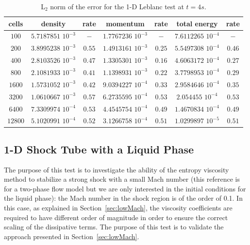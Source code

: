 \documentclass[review,10pt]{elsarticle}
\newcommand{\sct}[1]{Section~\ref{#1}}                   %
\begin{document}
\begin{table}[!htbp]
\begin{center}
 \caption{\label{tbl:l2_norm_leblanc} L$_2$ norm of the error for the 1-D Leblanc test at $t=4s$.}
 \begin{tabular}{|c|c|c|c|c|c|c|}
 \hline
   cells & density & rate & momentum & rate & total energy & rate \\ \hline
$100$ &   $5.7187851$ $10^{-3}$ & $-$ & $1.7767236$ $10^{-3}$ & $-$ & $7.6112265$  $10^{-4}$& $-$\\   \hline
$200$  &  $3.8995238$ $10^{-3}$ & $0.55$ & $1.4913161$ $10^{-3}$ & $0.25$ &  $5.5497308$ $10^{-4}$& $0.46$\\ \hline
$400$ & $2.8103526$ $10^{-3}$   & $0.47$ & $1.3305301$ $10^{-3}$ & $0.16$ & $4.6063172$ $10^{-4}$ & $0.27$\\ \hline
$800$ & $2.1081933$ $10^{-3}$   & $0.41$ & $1.1398931$ $10^{-3}$ & $0.22$ & $3.7798953$ $10^{-4}$ & $0.29$\\ \hline
$1600$ & $1.5731052$ $10^{-3}$  & $0.42$ & $9.0394227$ $10^{-4}$ & $0.33$ & $2.9584646$ $10^{-4}$ & $0.35$\\ \hline
$3200$&$1.0610667$ $10^{-3}$    & $0.57$ & $6.2735595$ $10^{-4}$ & $0.53$ & $2.054455$ $10^{-4}$ & $0.53$\\ \hline
$6400$&$7.3309974$ $10^{-4}$    & $0.53$ & $4.4545754$ $10^{-4}$ & $0.49$ & $1.4670834$ $10^{-4}$ & $0.49$\\ \hline
 $12800$&$5.1020991$ $10^{-4}$  & $0.52$ & $3.1266758$ $10^{-4}$ & $0.51$ & $1.0299897$ $10^{-5}$ & $0.51$\\  \hline
\end{tabular}
\end{center}
\nonumber
\end{table}

\subsection{1-D Shock Tube with a Liquid Phase} \label{sec:liquid_shock}
The purpose of this test is to investigate the ability of the entropy viscosity method to stabilize a strong 
shock with a small Mach number \cite{abgrall} (this reference is for a two-phase flow model but we are only 
interested in the initial conditions for the liquid phase): the Mach number in the shock region is of the 
order of 0.1. In this case, as explained in \sct{sec:lowMach}, the viscosity coefficients are required to 
have different order of magnitude in order to ensure the correct scaling of the dissipative terms. 
The purpose of this test is to validate the approach presented in \sct{sec:lowMach}. 
\end{document}
